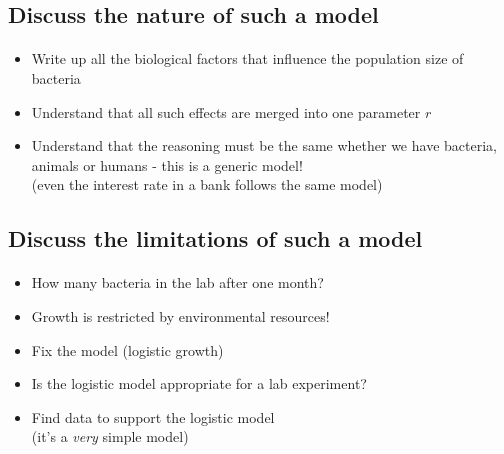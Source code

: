 \documentclass[%
twoside,                 %
final,                   %
10pt]{article}
\begin{document}
\subsection*{Discuss the nature of such a model}


\paragraph{}
\begin{itemize}
 \item Write up all the biological factors that influence the
   population size of bacteria

 \item Understand that all such effects are merged into one parameter $r$

 \item Understand that the reasoning must be the same whether we
   have bacteria, animals or humans - this is a generic model!\\
   (even the interest rate in a bank follows the same model)
\end{itemize}

\noindent



\subsection*{Discuss the limitations of such a model}


\paragraph{}
\begin{itemize}
 \item How many bacteria in the lab after one month?

 \item Growth is restricted by environmental resources!

 \item Fix the model (logistic growth)

 \item Is the logistic model appropriate for a lab experiment?

 \item Find data to support the logistic model \\
   (it's a \emph{very} simple model)
\end{itemize}
\end{document}
